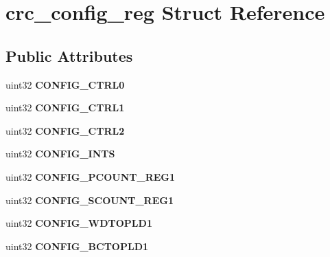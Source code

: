 \hypertarget{structcrc__config__reg}{}\section{crc\+\_\+config\+\_\+reg Struct Reference}
\label{structcrc__config__reg}
\subsection*{Public Attributes}
\begin{DoxyCompactItemize}
\item 
\mbox{\label{structcrc__config__reg_a9c13a5db09e606544130c85effbe2bda}} 
uint32 {\bfseries C\+O\+N\+F\+I\+G\+\_\+\+C\+T\+R\+L0}
\item 
\mbox{\label{structcrc__config__reg_a750ebf3a4b24029a3e6c04ee251c317c}} 
uint32 {\bfseries C\+O\+N\+F\+I\+G\+\_\+\+C\+T\+R\+L1}
\item 
\mbox{\label{structcrc__config__reg_ab99b320c35ac3fcab81dd60c6f958c68}} 
uint32 {\bfseries C\+O\+N\+F\+I\+G\+\_\+\+C\+T\+R\+L2}
\item 
\mbox{\label{structcrc__config__reg_aa2e8c9990ecb73b07437274712556b80}} 
uint32 {\bfseries C\+O\+N\+F\+I\+G\+\_\+\+I\+N\+TS}
\item 
\mbox{\label{structcrc__config__reg_a61a4bc03c1d4f53b18b4aaba87cc1cdb}} 
uint32 {\bfseries C\+O\+N\+F\+I\+G\+\_\+\+P\+C\+O\+U\+N\+T\+\_\+\+R\+E\+G1}
\item 
\mbox{\label{structcrc__config__reg_a79efc82829b408f4c6f8df673d0bdabd}} 
uint32 {\bfseries C\+O\+N\+F\+I\+G\+\_\+\+S\+C\+O\+U\+N\+T\+\_\+\+R\+E\+G1}
\item 
\mbox{\label{structcrc__config__reg_acb256d129d29373b0fa4c941432284e0}} 
uint32 {\bfseries C\+O\+N\+F\+I\+G\+\_\+\+W\+D\+T\+O\+P\+L\+D1}
\item 
\mbox{\label{structcrc__config__reg_a2a576585f863d368340dced634534f5e}} 
uint32 {\bfseries C\+O\+N\+F\+I\+G\+\_\+\+B\+C\+T\+O\+P\+L\+D1}

\end{DoxyCompactItemize}

